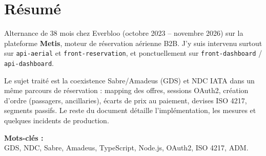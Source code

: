 \chapter*{Résumé}

\noindent Alternance de 38 mois chez Everbloo (octobre 2023 -- novembre 2026) sur la plateforme \textbf{Metis}, moteur de réservation aérienne B2B. J'y suis intervenu surtout sur \texttt{api-aerial} et \texttt{front-reservation}, et ponctuellement sur \texttt{front-dashboard} / \texttt{api-dashboard}.

\noindent Le sujet traité est la coexistence Sabre/Amadeus (GDS) et NDC IATA dans un même parcours de réservation : mapping des offres, sessions OAuth2, création d'ordre (passagers, ancillaries), écarts de prix au paiement, devises ISO 4217, segments passifs. Le reste du document détaille l'implémentation, les mesures et quelques incidents de production.

\vspace{0.6cm}
\noindent \textbf{\large Mots-clés :}\\
\noindent GDS, NDC, Sabre, Amadeus, TypeScript, Node.js, OAuth2, ISO 4217, ADM.
